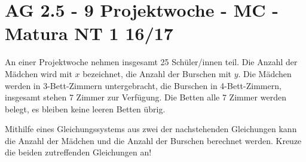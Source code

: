 \section{AG 2.5 - 9 Projektwoche - MC - Matura NT 1 16/17}

\begin{beispiel}[AG 2.5]{1} %
An einer Projektwoche nehmen insgesamt 25 Schüler/innen teil. Die Anzahl der Mädchen wird mit $x$ bezeichnet, die Anzahl der Burschen mit $y$. Die Mädchen werden in 3-Bett-Zimmern untergebracht, die Burschen in 4-Bett-Zimmern, insgesamt stehen 7 Zimmer zur Verfügung. Die Betten alle 7 Zimmer werden belegt, es bleiben keine leeren Betten übrig.

Mithilfe eines Gleichungssystems aus zwei der nachstehenden Gleichungen kann die Anzahl der Mädchen und die Anzahl der Burschen berechnet werden. Kreuze die beiden zutreffenden Gleichungen an!

\end{beispiel}